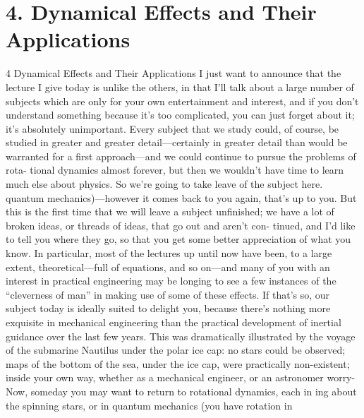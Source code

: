 \documentclass[10pt,oneside]{article}
\begin{document}
\clearpage
{}
\section*{4. Dynamical Effects and Their Applications}
\label{tips-sec-12-4-dynamical-effects-and-their-applications}
4 Dynamical Effects and Their Applications I just want to announce that the lecture I give today is unlike the others, in that I’ll talk about a large number of subjects which are only for your own entertainment and interest, and if you don’t understand something because it’s too complicated, you can just forget about it; it’s absolutely unimportant. Every subject that we study could, of course, be studied in greater and greater detail---certainly in greater detail than would be warranted for a first approach---and we could continue to pursue the problems of rota- tional dynamics almost forever, but then we wouldn’t have time to learn much else about physics. So we’re going to take leave of the subject here. quantum mechanics)---however it comes back to you again, that’s up to you. But this is the first time that we will leave a subject unfinished; we have a lot of broken ideas, or threads of ideas, that go out and aren’t con- tinued, and I’d like to tell you where they go, so that you get some better appreciation of what you know. In particular, most of the lectures up until now have been, to a large extent, theoretical---full of equations, and so on---and many of you with an interest in practical engineering may be longing to see a few instances of the “cleverness of man” in making use of some of these effects. If that’s so, our subject today is ideally suited to delight you, because there’s nothing more exquisite in mechanical engineering than the practical development of inertial guidance over the last few years. This was dramatically illustrated by the voyage of the submarine Nautilus under the polar ice cap: no stars could be observed; maps of the bottom of the sea, under the ice cap, were practically non-existent; inside your own way, whether as a mechanical engineer, or an astronomer worry- Now, someday you may want to return to rotational dynamics, each in ing about the spinning stars, or in quantum mechanics (you have rotation in\par
\end{document}
